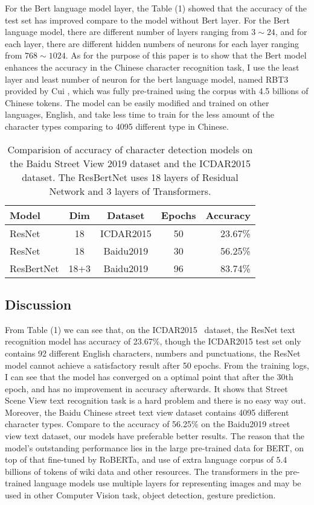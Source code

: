 \documentclass[review]{cvpr}
\begin{document}
For the Bert language model layer, the Table (1) showed that the accuracy of the test set has improved compare to the model without Bert layer.
For the Bert language model, there are different number of layers ranging from $3\sim24$, and for each layer,
there are different hidden numbers of neurons for each layer ranging from $768\sim1024$.
As for the purpose of this paper is to show that the Bert model enhances the accuracy in the Chinese character recognition task,
I use the least layer and least number of neuron for the bert language model, named RBT3 provided by Cui \etal,
which was fully pre-trained using the corpus with 4.5 billions of Chinese tokens.
The model can be easily modified and trained on other languages, \eg English,
and take less time to train for the less amount of the character types comparing to
4095 different type in Chinese.


\begin{table}
\begin{center}
\begin{tabular}{|l|c|c|c|r|}
\hline
Model & Dim & Dataset& Epochs & Accuracy \\
\hline\hline
ResNet      & 18 &  ICDAR2015     & 50 &	23.67\% \\
ResNet      & 18 &  Baidu2019	  & 30 &	56.25\% \\
ResBertNet  & 18+3 & Baidu2019    & 96	&	83.74\% \\
\hline
\end{tabular}
\end{center}
\caption{Comparision of accuracy of character detection models on the Baidu Street View 2019 dataset and the ICDAR2015 dataset.
The ResBertNet uses 18 layers of Residual Network and 3 layers of Transformers.}
\end{table}


\subsection{Discussion}

From Table (1) we can see that, on the ICDAR2015~\cite{karatzas2015icdar} dataset, the ResNet text recognition model has accuracy of 23.67\%,
though the ICDAR2015 test set only contains 92 different English characters, numbers and punctuations,
the ResNet model cannot achieve a satisfactory result after 50 epochs.
From the training logs, I can see that the model has converged on a optimal point that after the 30th epoch,
and has no improvement in accuracy afterwards.
It shows that Street Scene View text recognition task is a hard problem and there is no easy way out.
Moreover, the Baidu Chinese street text view dataset contains 4095 different character types.
Compare to the accuracy of 56.25\% on the Baidu2019 street view text dataset, our models have preferable better results.
The reason that the model's outstanding performance lies in the large pre-trained data for BERT, on top of that fine-tuned by RoBERTa, and use of extra language corpus of
$5.4$ billions of tokens of wiki data and other resources.
The transformers in the pre-trained language models use multiple layers for representing images and may be used in other Computer Vision task, \eg object detection, gesture prediction.
\end{document}
